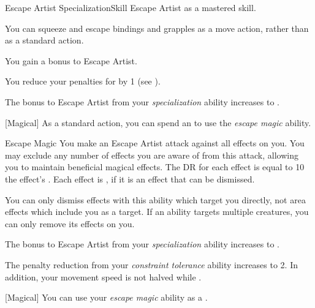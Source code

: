     \begin{feat}{Escape Artist Specialization}{Skill}
        \featpre Escape Artist as a mastered skill.

         You can squeeze and escape bindings and grapples as a move action, rather than as a standard action.

         You gain a  bonus to Escape Artist.

         You reduce your penalties for  by 1 (see ).

         The bonus to Escape Artist from your \textit{specialization} ability increases to .

        [Magical] As a standard action, you can spend an  to use the \textit{escape magic} ability.
        \begin{ability}{Escape Magic}
            You make an Escape Artist attack against all  effects on you.
            You may exclude any number of effects you are aware of from this attack, allowing you to maintain beneficial magical effects.
            The DR for each effect is equal to 10 \add the effect's .
            \hit Each effect is , if it is an effect that can be dismissed.
        \end{ability}

        You can only dismiss effects with this ability which target you directly, not area effects which include you as a target.
        If an ability targets multiple creatures, you can only remove its effects on you.

         The bonus to Escape Artist from your \textit{specialization} ability increases to .

         The penalty reduction from your \textit{constraint tolerance} ability increases to 2.
        In addition, your movement speed is not halved while .

        [Magical] You can use your \textit{escape magic} ability as a .
    \end{feat}

